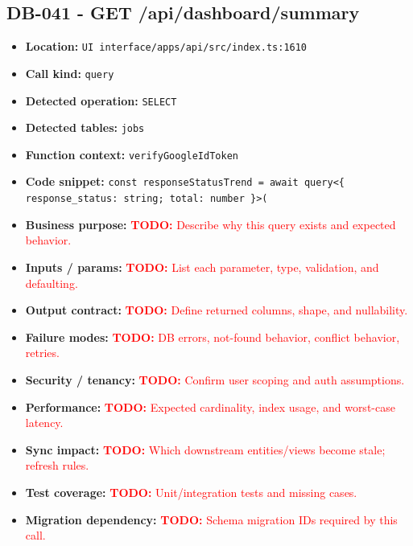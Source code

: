 \documentclass[11pt]{article}
\newcommand{\todoitem}[1]{\textcolor{red}{\textbf{TODO:} #1}}
\begin{document}
\subsection{DB-041 - GET /api/dashboard/summary}
\begin{itemize}[leftmargin=1.5em]
\item \textbf{Location:} \texttt{UI interface/apps/api/src/index.ts:1610}
\item \textbf{Call kind:} \texttt{query}
\item \textbf{Detected operation:} \texttt{SELECT}
\item \textbf{Detected tables:} \texttt{jobs}
\item \textbf{Function context:} \texttt{verifyGoogleIdToken}
\item \textbf{Code snippet:} \texttt{const responseStatusTrend = await query<\{ response\_status: string; total: number \}>(}
\item \textbf{Business purpose:} \todoitem{Describe why this query exists and expected behavior.}
\item \textbf{Inputs / params:} \todoitem{List each parameter, type, validation, and defaulting.}
\item \textbf{Output contract:} \todoitem{Define returned columns, shape, and nullability.}
\item \textbf{Failure modes:} \todoitem{DB errors, not-found behavior, conflict behavior, retries.}
\item \textbf{Security / tenancy:} \todoitem{Confirm user scoping and auth assumptions.}
\item \textbf{Performance:} \todoitem{Expected cardinality, index usage, and worst-case latency.}
\item \textbf{Sync impact:} \todoitem{Which downstream entities/views become stale; refresh rules.}
\item \textbf{Test coverage:} \todoitem{Unit/integration tests and missing cases.}
\item \textbf{Migration dependency:} \todoitem{Schema migration IDs required by this call.}
\end{itemize}
\end{document}
